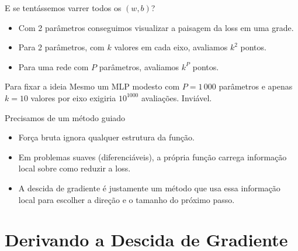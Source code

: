 \documentclass[aspectratio=169,xcolor=dvipsnames]{beamer}
\begin{document}
  \begin{frame}{E se tentássemos varrer todos os $(w,b)$?}
    \begin{itemize}
      \item Com 2 parâmetros conseguimos visualizar a paisagem da loss em uma grade.
      \item Para 2 parâmetros, com $k$ valores em cada eixo, avaliamos $k^2$ pontos.
      \item Para uma rede com $P$ parâmetros, avaliamos $k^P$ pontos.
    \end{itemize}
    \vfill
    \begin{exampleblock}{Para fixar a ideia}
      Mesmo um MLP modesto com $P{=}1\,000$ parâmetros e apenas $k{=}10$ valores por eixo
      exigiria $10^{1000}$ avaliações. Inviável.
    \end{exampleblock}
  \end{frame}

  \begin{frame}{Precisamos de um método guiado}
    \begin{itemize}
      \item Força bruta ignora qualquer estrutura da função.
      \item Em problemas suaves (diferenciáveis), a própria função carrega informação
        local sobre como reduzir a loss.
      \item A descida de gradiente é justamente um método que usa essa informação
        local para escolher a direção e o tamanho do próximo passo.
    \end{itemize}
  \end{frame}

  \section{Derivando a Descida de Gradiente}
\end{document}
